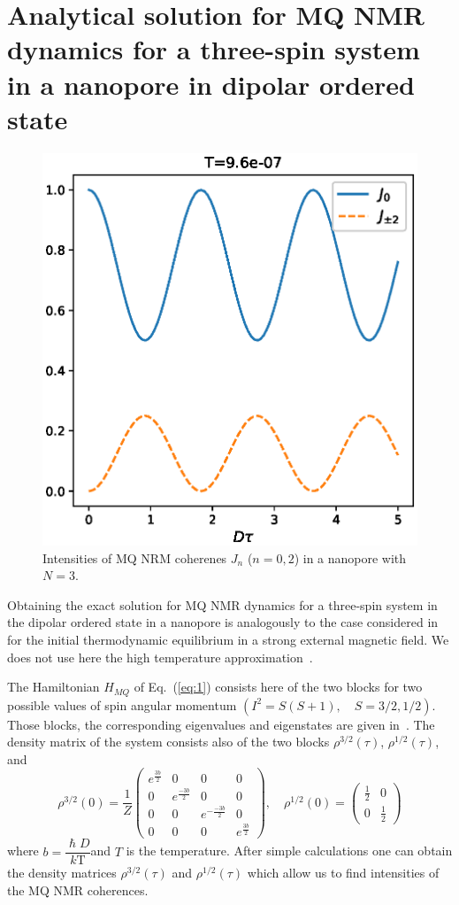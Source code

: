 \documentclass[review]{elsarticle}
\begin{document}
\section{Analytical solution for MQ NMR dynamics for a three-spin system in a nanopore in dipolar ordered state}
\label{sec:3}

\begin{figure}
    \centering
  	\includegraphics[width=0.5\linewidth]{coherences_n3_beta5.eps}
	\caption{
	    Intensities of MQ NRM coherenes $J_{n}$ ($n=0, 2$) in a nanopore with $N=3$.
	}
	\label{fig:1}
\end{figure}

Obtaining the exact solution for MQ NMR dynamics for a three-spin system in the dipolar ordered state in a nanopore is analogously to the case considered in~\cite{Doronin_2019} for the initial thermodynamic equilibrium in a strong external magnetic field. 
We does not use here the high temperature approximation~\cite{Andrew_1971}.

The Hamiltonian $H_{MQ}$ of Eq.~(\ref{eq:1}) consists here of the two blocks for two possible values of spin angular momentum $(I^2 = S(S+1),  \quad S=3/2,1/2)$.
Those blocks, the corresponding eigenvalues and eigenstates are given in~\cite{Doronin_2019}.
The density matrix of the system consists also of the two blocks $\rho^{3/2}(\tau)$, $\rho^{1/2}(\tau)$, and 
%
\begin{equation}
    \label{eq:15} 
    \rho^{3/2}(0) = \dfrac 1 Z
    \begin{pmatrix}
        e^{\frac{3b}{2}} & 0 & 0 & 0 
        \\
        0 & e^{\frac{-3b}{2}} & 0 & 0 
        \\
        0 & 0 & e^{-\frac{-3b}{2}} & 0 
        \\
        0 & 0 & 0 & e^{\frac{3b}{2}}
    \end{pmatrix}, 
    \quad
    \rho^{1/2}(0) = 
    \begin{pmatrix}
        \frac 1 2 & 0 
        \\
        0 & \frac 1 2
    \end{pmatrix}
\end{equation}
%
where $b = \dfrac{\hslash D}{k\mathrm{T}}$and $T$ is the temperature.
After simple calculations one can obtain the density matrices $\rho^{3/2}(\tau)$ and $\rho^{1/2}(\tau)$ 
which allow us to find intensities of the MQ NMR coherences.
\end{document}
